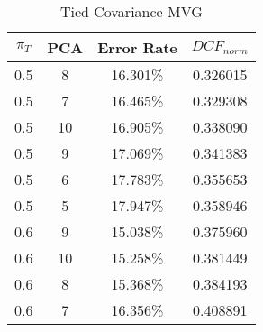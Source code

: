\begin{center}
\begin{longtable}{|c|c|c|c|}
\caption{Tied Covariance MVG}\label{tab:mvg_tiedcov}\\
\hline
$\pi_T$ & PCA & Error Rate & $DCF_{norm}$\\
\hline
0.5 & 8 & 16.301\% & 0.326015\\
\hline
0.5 & 7 & 16.465\% & 0.329308\\
\hline
0.5 & 10 & 16.905\% & 0.338090\\
\hline
0.5 & 9 & 17.069\% & 0.341383\\
\hline
0.5 & 6 & 17.783\% & 0.355653\\
\hline
0.5 & 5 & 17.947\% & 0.358946\\
\hline
0.6 & 9 & 15.038\% & 0.375960\\
\hline
0.6 & 10 & 15.258\% & 0.381449\\
\hline
0.6 & 8 & 15.368\% & 0.384193\\
\hline
0.6 & 7 & 16.356\% & 0.408891\\
\hline
\hline
\end{longtable}
\end{center}
